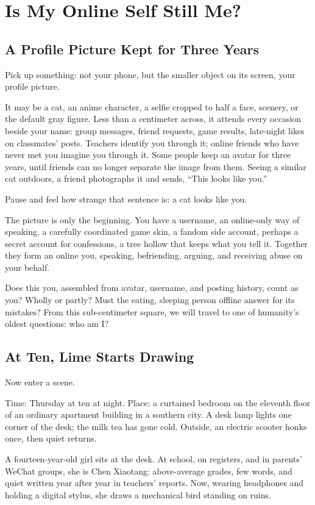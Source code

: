 \chapter{Is My Online Self Still Me?}
\section{A Profile Picture Kept for Three Years}
Pick up something: not your phone, but the smaller object on its screen, your profile picture.

It may be a cat, an anime character, a selfie cropped to half a face, scenery, or the default gray figure. Less than a centimeter across, it attends every occasion beside your name: group messages, friend requests, game results, late-night likes on classmates' posts. Teachers identify you through it; online friends who have never met you imagine you through it. Some people keep an avatar for three years, until friends can no longer separate the image from them. Seeing a similar cat outdoors, a friend photographs it and sends, ``This looks like you.''

Pause and feel how strange that sentence is: a cat looks like you.

The picture is only the beginning. You have a username, an online-only way of speaking, a carefully coordinated game skin, a fandom side account, perhaps a secret account for confessions, a tree hollow that keeps what you tell it. Together they form an online you, speaking, befriending, arguing, and receiving abuse on your behalf.

Does this you, assembled from avatar, username, and posting history, count as you? Wholly or partly? Must the eating, sleeping person offline answer for its mistakes? From this sub-centimeter square, we will travel to one of humanity's oldest questions: who am I?

\section{At Ten, Lime Starts Drawing}
Now enter a scene.

Time: Thursday at ten at night. Place: a curtained bedroom on the eleventh floor of an ordinary apartment building in a southern city. A desk lamp lights one corner of the desk; the milk tea has gone cold. Outside, an electric scooter honks once, then quiet returns.

A fourteen-year-old girl sits at the desk. At school, on registers, and in parents' WeChat groups, she is Chen Xiaotang: above-average grades, few words, and quiet written year after year in teachers' reports. Now, wearing headphones and holding a digital stylus, she draws a mechanical bird standing on ruins.

